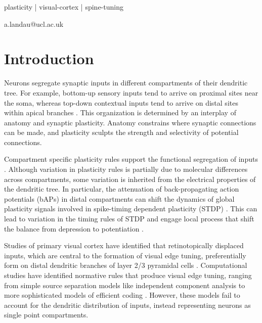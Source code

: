 \documentclass[twocolumn]{theme/bioRxiv}
\begin{document}
\begin{keywords}
plasticity | visual-cortex | spine-tuning
\end{keywords}

\begin{corrauthor}
a.landau@ucl.ac.uk
\end{corrauthor}

\section*{Introduction}\label{s:introduction}

Neurons segregate synaptic inputs in different compartments of their dendritic tree. For example, bottom-up sensory inputs tend to arrive on proximal sites near the soma, whereas top-down contextual inputs tend to arrive on distal sites within apical branches \citep{andersonSynapticConnectionsCortical2009, iacarusoSynapticOrganizationVisual2017, petreanuSubcellularOrganizationNeocortical2009, andersenHippocampusBook2006}. This organization is determined by an interplay of anatomy and synaptic plasticity. Anatomy constrains where synaptic connections can be made, and plasticity sculpts the strength and selectivity of potential connections. 

Compartment specific plasticity rules support the functional segregation of inputs \citep{wrightDistinctSynapticPlasticity2025, sprustonPyramidalNeuronsDendritic2008, goldingDendriticSpikesMechanism2002, cichonBranchspecificDendriticCa22015, gambinoSensoryevokedLTPDriven2014}. Although variation in plasticity rules is partially due to molecular differences across compartments, some variation is inherited from the electrical properties of the dendritic tree. In particular, the attenuation of back-propagating action potentials (bAPs) in distal compartments can shift the dynamics of global plasticity signals involved in spike-timing dependent plasticity (STDP) \citep{froemkeSpiketimingdependentSynapticPlasticity2005}. This can lead to variation in the timing rules of STDP \citep{froemkeSpiketimingdependentSynapticPlasticity2005} and engage local process that shift the balance from depression to potentiation \citep{sjostromCooperativeSwitchDetermines2006}.

Studies of primary visual cortex have identified that retinotopically displaced inputs, which are central to the formation of visual edge tuning, preferentially form on distal dendritic branches of layer 2/3 pyramidal cells \citep{iacarusoSynapticOrganizationVisual2017, lempelDevelopmentCoherentCortical2025}. Computational studies have identified normative rules that produce visual edge tuning, ranging from simple source separation models like independent component analysis to more sophisticated models of efficient coding \citep{olshausenEmergenceSimplecellReceptive1996, bellInformationMaximizationApproachBlind1999}. However, these models fail to account for the dendritic distribution of inputs, instead representing neurons as single point compartments.
\end{document}
